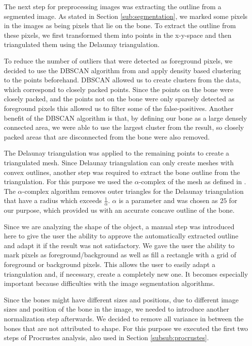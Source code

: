 \documentclass[pdftex,12pt,a4paper]{report}
\begin{document}
The next step for preprocessing images was extracting the outline from a segmented image. As stated in Section
\ref{sub:segmentation}, we marked some pixels in the images as being pixels that lie on the bone.
To extract the outline from these pixels, we first transformed them into points in the x-y-space and then
triangulated them using the Delaunay triangulation.

To reduce the number of outliers that were detected as foreground pixels,
we decided to use the DBSCAN algorithm from \cite{ester1996density} and apply density based clustering to the points
beforehand. DBSCAN allowed us to create clusters from the data, which correspond to closely packed points. Since
the points on the bone were closely packed, and the points not on the bone were only sparsely detected as
foreground pixels this allowed us to filter some of the false-positives. Another benefit of the DBSCAN algorithm is that,
by defining our bone as a large densely connected area, we were able to use the largest cluster from the result,
so closely packed areas that are disconnected from the bone were also removed.

The Delaunay triangulation was applied to the remaining points to create a triangulated mesh. Since Delaunay
triangulation can only create meshes with convex outlines, another step was required to extract the bone outline
from the triangulation. For this purpose we used the $\alpha$-complex of the mesh as defined in \cite{akkirajualpha}.
The $\alpha$-complex algorithm removes outer triangles for the Delaunay triangulation that have a radius which exceeds
$\frac{1}{\alpha}$. $\alpha$ is a parameter and was chosen as $25$ for our purpose, which provided us with
an accurate concave outline of the bone.

Since we are analyzing the shape of the object, a manual step was introduced here to give the user the ability to
approve the automatically extracted outline and adapt it if the result was not satisfactory. We gave the user the
ability to mark pixels as foreground/background as well as fill a rectangle with a grid of foreground or background pixels.
This allows the user to easily adapt a triangulation and, if necessary, create a completely new one. It becomes
especially important because difficulties with the image segmentation algorithms.

Since the bones might have different sizes and positions, due to different image sizes and position of the bone in
the image, we needed to introduce another normalization step afterwards. We decided to remove all variance in between the bones that are not attributed to shape. For this purpose we executed the first two steps of Procrustes
analysis, also used in Section \ref{subsub:procrustes}.
\end{document}
